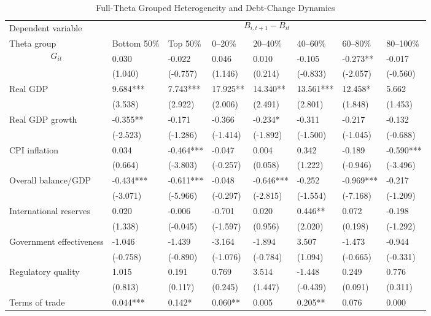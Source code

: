 \begin{table}[H]\centering
\begin{threeparttable}
\caption{Full-Theta Grouped Heterogeneity and Debt-Change Dynamics}
\label{tab:theta_group_heterogeneity_debt}
\scriptsize
\begin{tabularx}{\textwidth}{lYYYYYYY}
\toprule
Dependent variable &  \\
\cmidrule(lr){2-8}
Theta group & Bottom 50\% & Top 50\% & 0--20\% & 20--40\% & 40--60\% & 60--80\% & 80--100\% \\
\midrule
$$G_{it}$$ & 0.030 & -0.022 & 0.046 & 0.010 & -0.105 & -0.273** & -0.017 \\
  & (1.040) & (-0.757) & (1.146) & (0.214) & (-0.833) & (-2.057) & (-0.560) \\
Real GDP & 9.684*** & 7.743*** & 17.925** & 14.340** & 13.561*** & 12.458* & 5.662 \\
  & (3.538) & (2.922) & (2.006) & (2.491) & (2.801) & (1.848) & (1.453) \\
Real GDP growth & -0.355** & -0.171 & -0.366 & -0.234* & -0.311 & -0.217 & -0.132 \\
  & (-2.523) & (-1.286) & (-1.414) & (-1.892) & (-1.500) & (-1.045) & (-0.688) \\
CPI inflation & 0.034 & -0.464*** & -0.047 & 0.004 & 0.342 & -0.189 & -0.590*** \\
  & (0.664) & (-3.803) & (-0.257) & (0.058) & (1.222) & (-0.946) & (-3.496) \\
Overall balance/GDP & -0.434*** & -0.611*** & -0.048 & -0.646*** & -0.252 & -0.969*** & -0.217 \\
  & (-3.071) & (-5.966) & (-0.297) & (-2.815) & (-1.554) & (-7.168) & (-1.209) \\
International reserves & 0.020 & -0.006 & -0.701 & 0.020 & 0.446** & 0.072 & -0.198 \\
  & (1.338) & (-0.045) & (-1.597) & (0.956) & (2.020) & (0.198) & (-1.292) \\
Government effectiveness & -1.046 & -1.439 & -3.164 & -1.894 & 3.507 & -1.473 & -0.944 \\
  & (-0.758) & (-0.890) & (-1.076) & (-0.784) & (1.094) & (-0.665) & (-0.331) \\
Regulatory quality & 1.015 & 0.191 & 0.769 & 3.514 & -1.448 & 0.249 & 0.776 \\
  & (0.813) & (0.117) & (0.245) & (1.447) & (-0.439) & (0.091) & (0.311) \\
Terms of trade & 0.044*** & 0.142* & 0.060** & 0.005 & 0.205** & 0.076 & 0.000 \\

\end{tabularx}
\end{threeparttable}
\end{table}

